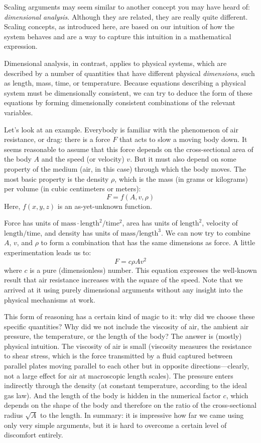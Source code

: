  
Scaling arguments may seem similar to another concept you may have
heard of: \emph{dimensional analysis}. Although they are related, they
are really quite different. Scaling concepts, as introduced here, are
based on our intuition of how the system behaves and are a way to
capture this intuition in a mathematical expression.

Dimensional analysis, in contrast, applies to physical systems, which
are described by a number of quantities that have different physical
\emph{dimensions}, such as length, mass, time, or temperature. Because
equations describing a physical system must be dimensionally
consistent, we can try to deduce the form of these equations by forming
dimensionally consistent combinations of the relevant variables.

Let's look at an example. Everybody is familiar with the phenomenon of
air resistance, or drag: there is a force $F$ that acts to slow a
moving body down. It seems reasonable to assume that this force
depends on the cross-sectional area of the body $A$ and the speed 
(or velocity) $v$.
But it must also depend on some property of the medium (air, in this
case) through which the body moves. The most basic property is the
density $\rho$, which is the mass (in grams or kilograms) per volume
(in cubic centimeters or meters):
%
\[
F = f( A, v, \rho )
\]
%
Here, $f(x,y,z)$ is an as-yet-unknown function. 

Force has units of $\text{mass} \cdot \text{length}^2/\text{time}^2$,
area has units of $\text{length}^2$, velocity of
$\text{length}/\text{time}$, and density has units of
$\text{mass}/\text{length}^3$. We can now try to combine $A$, $v$, and
$\rho$ to form a combination that has the same dimensions as force. A
little experimentation leads us to:
%
\[
F = c \rho A v^2
\]
%
where $c$ is a pure (dimensionless) number. This equation expresses
the well-known result that air resistance increases with the square of
the speed. Note that we arrived at it using purely dimensional
arguments without any insight into the physical mechanisms at work.

This form of reasoning has a certain kind of magic to it: why did we
choose these specific quantities? Why did we not include the viscosity
of air, the ambient air pressure, the temperature, or the length of
the body? The answer is (mostly) physical intuition.  The viscosity
of air is small (viscosity measures the resistance to shear stress,
which is the force transmitted by a fluid captured between parallel
plates moving parallel to each other but in opposite
directions---clearly, not a large effect for air at macroscopic length
scales). The pressure enters indirectly through the density (at
constant temperature, according to the ideal gas law). And the length
of the body is hidden in the numerical factor $c$, which depends on
the shape of the body and therefore on the ratio of the
cross-sectional radius $\sqrt{A}$ to the length. In summary: it is
impressive how far we came using only very simple arguments, but it is
hard to overcome a certain level of discomfort entirely.


